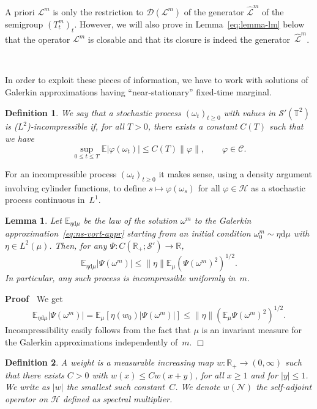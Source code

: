 \documentclass[10pt]{article}
\newcommand{\mathd}{\mathrm{d}}
\newcommand{\tmem}[1]{{\em #1\/}}
\newenvironment{proof}{\noindent\textbf{Proof\ }}{\hspace*{\fill}$\Box$\medskip}
\newtheorem{definition}{Definition}
\newtheorem{lemma}{Lemma}
\begin{document}
A priori $\mathcal{L}^m$ is only the restriction to $\mathcal{D}
(\mathcal{L}^m)$ of the generator $\hat{\mathcal{L}}^m$ of the semigroup
$(T^m_t)_t$. However, we will also prove in Lemma~\ref{eq:lemma-lm} below that
the operator $\mathcal{L}^m$ is closable and that its closure is indeed the
generator~$\hat{\mathcal{L}}^m$.

\

In order to exploit these pieces of information, we have to work with
solutions of Galerkin approximations having ``near-stationary'' fixed-time
marginal.

\begin{definition}
  We say that a stochastic process $(\omega_t)_{t \geqslant 0}$ with values in
  $\mathcal{S}' (\mathbb{T}^2)$ is ($L^2$)-incompressible if, for all $T > 0$,
  there exists a constant $C (T)$ such that we have
  \[ \sup_{0 \leqslant t \leqslant T} \mathbb{E} | \varphi (\omega_t) |
     \leqslant C (T) \| \varphi \|, \qquad \varphi \in \mathcal{C}. \]
\end{definition}

For an incompressible process $(\omega_t)_{t \geqslant 0}$ it makes sense,
using a density argument involving cylinder functions, to define $s \mapsto
\varphi (\omega_s)$ for all $\varphi \in \mathcal{H}$ as a stochastic process
continuous in~$L^1$.

\begin{lemma}
  \label{lem:est-eta}Let $\mathbb{E}_{\eta \mathd \mu}$ be the law of the
  solution $\omega^m$ to the Galerkin approximation~{\eqref{eq:ns-vort-appr}}
  starting from an initial condition $\omega^m_0 \sim \eta \mathd \mu$ with
  $\eta \in L^2 (\mu)$. Then, for any $\Psi : C (\mathbb{R}_+ ; \mathcal{S}')
  \rightarrow \mathbb{R}$,
  \[ \mathbb{E}_{\eta \mathd \mu} | \Psi (\omega^m) | \leqslant \| \eta \|
     \mathbb{E}_{\mu} (\Psi (\omega^m)^2)^{1 / 2} . \]
  In particular, any such process is incompressible uniformly in~$m$.
\end{lemma}

\begin{proof}
  We get
  \[ \mathbb{E}_{\eta \mathd \mu} | \Psi (\omega^m) | =\mathbb{E}_{\mu} [\eta
     (w_0) | \Psi (\omega^m) |] \leqslant \| \eta \| (\mathbb{E}_{\mu} \Psi
     (\omega^m)^2)^{1 / 2} . \]
  Incompressibility easily follows from the fact that $\mu$ is an invariant
  measure for the Galerkin approximations independently of~$m$.
\end{proof}

\begin{definition}
  A {\tmem{weight}} is a measurable increasing map $w : \mathbb{R}_+
  \rightarrow (0, \infty)$ such that there exists $C > 0$ with $w (x)
  \leqslant C w (x + y)$, for all $x \geqslant 1$ and for $| y | \leqslant 1$.
  We write as $| w |$ the smallest such constant~$C$. We denote $w
  (\mathcal{N})$ the self-adjoint operator on $\mathcal{H}$ defined as
  spectral multiplier.
\end{definition}
\end{document}
